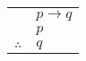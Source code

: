 \documentclass{standalone}
\begin{document}
\begin{tabular}{rl}
    & $p\to q$ \\
    & $p$ \\
    \hline
    $\therefore$ & $q$
\end{tabular}
\end{document}
